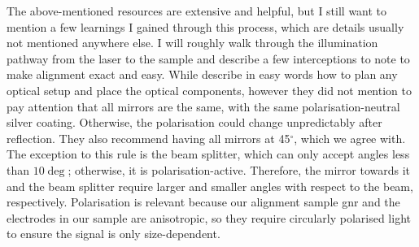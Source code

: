 		The above-mentioned resources are extensive and helpful, but I still want to mention a few learnings I gained through this process, which are details usually not mentioned anywhere else. I will roughly walk through the illumination pathway from the laser to the sample and describe a few interceptions to note to make alignment exact and easy. %
        While \cite[McClelland and Mankin]{mcclelland2018optical} describe in easy words how to plan any optical setup and place the optical components, however they did not mention to pay attention that all mirrors are the same, with the same polarisation-neutral silver coating. Otherwise, the polarisation could change unpredictably after reflection. They also recommend having all mirrors at 45$^\circ$, which we agree with. The exception to this rule is the beam splitter, which can only accept angles less than $10\deg$; otherwise, it is polarisation-active. Therefore, the mirror towards it and the beam splitter require larger and smaller angles with respect to the beam, respectively. Polarisation is relevant because our alignment sample \gls{gnr} and the electrodes in our sample are anisotropic, so they require circularly polarised light to ensure the signal is only size-dependent.\\ 
